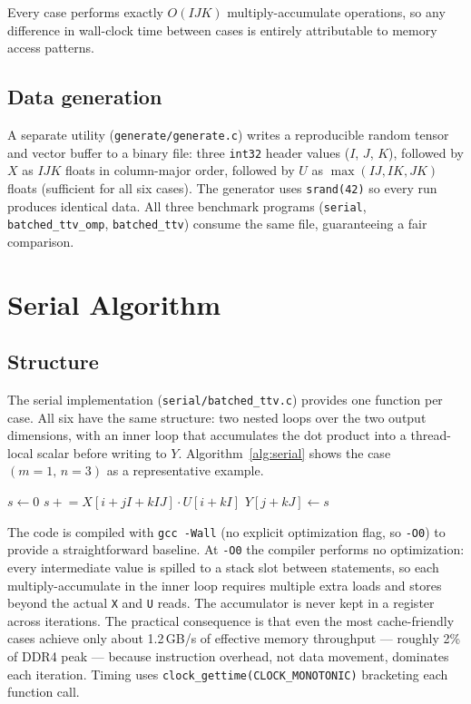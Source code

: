 \documentclass[11pt]{article}
\begin{document}
Every case performs exactly $O(IJK)$ multiply-accumulate operations,
so any difference in wall-clock time between cases is entirely
attributable to memory access patterns.

\subsection{Data generation}

A separate utility (\texttt{generate/generate.c}) writes a reproducible
random tensor and vector buffer to a binary file: three \texttt{int32}
header values ($I$, $J$, $K$), followed by $X$ as $IJK$ floats in
column-major order, followed by $U$ as $\max(IJ,IK,JK)$ floats
(sufficient for all six cases).  The generator uses \texttt{srand(42)}
so every run produces identical data.  All three benchmark programs
(\texttt{serial}, \texttt{batched\_ttv\_omp}, \texttt{batched\_ttv})
consume the same file, guaranteeing a fair comparison.

\section{Serial Algorithm}

\subsection{Structure}

The serial implementation (\texttt{serial/batched\_ttv.c}) provides
one function per case.  All six have the same structure: two nested
loops over the two output dimensions, with an inner loop that accumulates
the dot product into a thread-local scalar before writing to $Y$.
Algorithm~\ref{alg:serial} shows the case $(m{=}1,\,n{=}3)$ as a
representative example.

\begin{algorithm}[h]
\caption{Serial BTTV, case $(m{=}1,\,n{=}3)$}
\label{alg:serial}
\begin{algorithmic}[1]
    \State $s \gets 0$
      \State $s \mathrel{+}= X[i{+}jI{+}kIJ] \cdot U[i{+}kI]$
    \EndFor
    \State $Y[j{+}kJ] \gets s$
  \EndFor
\EndFor
\end{algorithmic}
\end{algorithm}

The code is compiled with \texttt{gcc -Wall} (no explicit optimization
flag, so \texttt{-O0}) to provide a straightforward baseline.
At \texttt{-O0} the compiler performs no optimization: every intermediate
value is spilled to a stack slot between statements, so each
multiply-accumulate in the inner loop requires multiple extra loads and
stores beyond the actual \texttt{X} and \texttt{U} reads.  The
accumulator is never kept in a register across iterations.  The practical
consequence is that even the most cache-friendly cases achieve only about
1.2\,GB/s of effective memory throughput --- roughly 2\% of DDR4 peak ---
because instruction overhead, not data movement, dominates each iteration.
Timing uses \texttt{clock\_gettime(CLOCK\_MONOTONIC)} bracketing each
function call.
\end{document}

